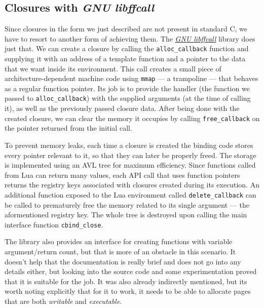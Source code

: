 \documentclass[polish, english]{iithesis}
\begin{document}
    \subsection{Closures with \textit{GNU libffcall}}\label{ffcall_closures}
      Since closures in the form we just described are not present in standard C, we have to resort to another form of achieving them.
      The \href{https://www.gnu.org/software/libffcall/}{\textit{GNU libffcall}} library does just that.
      We can create a closure by calling the \texttt{alloc\_callback} function and supplying it with an address of a template function and a pointer to the data that we want inside its environment.
      This call creates a small piece of architecture-dependent machine code using \texttt{mmap} --- a trampoline --- that behaves as a regular function pointer.
      Its job is to provide the handler (the function we passed to \texttt{alloc\_callback}) with the supplied arguments (at the time of calling it), as well as the previously passed closure data.
      After being done with the created closure, we can clear the memory it occupies by calling \texttt{free\_callback} on the pointer returned from the initial call.

      To prevent memory leaks, each time a closure is created the binding code stores every pointer relevant to it, so that they can later be properly freed.
      The storage is implemented using an AVL tree for maximum efficiency.
      Since functions called from Lua can return many values, each API call that uses function pointers returns the registry keys associated with closures created during its execution.
      An additional function exposed to the Lua environment called \texttt{delete\_callback} can be called to prematurely free the memory related to its single argument --- the aformentioned registry key.
      The whole tree is destroyed upon calling the main interface function \texttt{cbind\_close}.

      The library also provides an interface for creating functions with variable argument/return count, but that is more of an obstacle in this scenario.
      It doesn't help that the documentation is really brief and does not go into any details either, but looking into the source code and some experimentation proved that it is suitable for the job.
      It was also already indirectly mentioned, but its worth noting explicitly that for it to work, it needs to be able to allocate pages that are both \textit{writable} and \textit{executable}.
\end{document}
